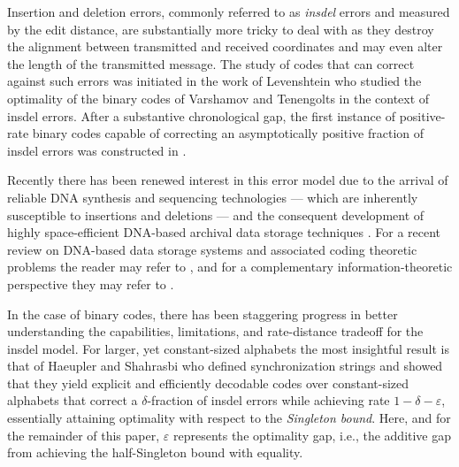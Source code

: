 \documentclass[draft, onecolumn, 11pt]{IEEEtran}
\begin{document}
Insertion and deletion errors, commonly referred to as \emph{insdel} errors and measured by the edit distance, are substantially more tricky to deal with as they destroy the alignment between transmitted and received coordinates and may even alter the length of the transmitted message. The study of codes that can correct against such errors was initiated in the work of Levenshtein \cite{levenshtein1966binary} who studied the optimality of the binary codes of Varshamov and Tenengolts \cite{varshamov1965codes} in the context of insdel errors. After a substantive chronological gap, the first instance of positive-rate binary codes capable of correcting an asymptotically positive fraction of insdel errors was constructed in \cite{schulman1999asymptotically}. 

Recently there has been renewed interest in this error model due to the arrival of reliable DNA synthesis and sequencing technologies --- which are inherently susceptible to insertions and deletions --- and the consequent development of highly space-efficient DNA-based archival data storage techniques \cite{goldman2013towards}. 
For a recent review on DNA-based data storage systems and associated coding theoretic problems the reader may refer to \cite{milenkovic2024review}, and for a complementary information-theoretic perspective they may refer to \cite{viterbo2023review}.

In the case of binary codes, there has been staggering progress \cite{levenshtein2002bounds, guruswami2021explicit, sima2020optimal, sima2020systematic, cheng2018deterministic, haeupler2019optimal, guruswami2016efficiently, guruswami2022zero, yasunaga2024improved, qiu2026binary} in better understanding the capabilities, limitations, and rate-distance tradeoff for the insdel model. For larger, yet constant-sized alphabets the most insightful result is that of Haeupler and Shahrasbi \cite{haeupler2021synchronization-org} who defined synchronization strings and showed that they yield explicit and efficiently decodable codes over constant-sized alphabets that correct a $\delta$-fraction of insdel errors while achieving rate $1-\delta-\varepsilon$, essentially attaining optimality with respect to the \emph{Singleton bound}. Here, and for the remainder of this paper, $\varepsilon$ represents the optimality gap, i.e., the additive gap from achieving the half-Singleton bound with equality.   
\end{document}
